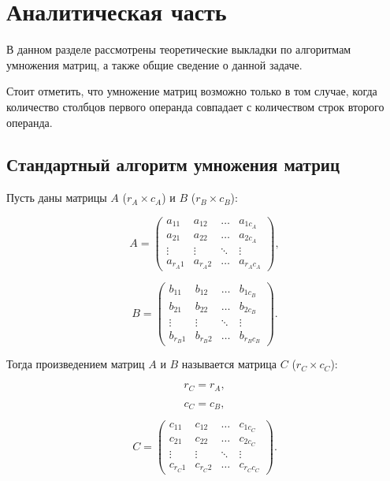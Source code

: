 \chapter{Аналитическая часть}

В данном разделе рассмотрены теоретические выкладки по алгоритмам умножения матриц, а также общие сведение о данной задаче.

Стоит отметить, что умножение матриц возможно только в том случае, когда количество столбцов первого операнда совпадает с количеством строк второго операнда.

\section{Стандартный алгоритм умножения матриц}

Пусть даны матрицы $A$ ($r_A \times c_A$) и $B$ ($r_B \times c_B$):

\begin{equation} \label{eqn:A}
	A = \begin{pmatrix}
		a_{11} & a_{12} & \ldots & a_{1c_A}\\
		a_{21} & a_{22} & \ldots & a_{2c_A}\\
		\vdots & \vdots & \ddots & \vdots\\
		a_{r_A1} & a_{r_A2} & \ldots & a_{r_Ac_A}
	\end{pmatrix},
\end{equation}

\begin{equation} \label{eqn:B}
	B = \begin{pmatrix}
		b_{11} & b_{12} & \ldots & b_{1c_B}\\
		b_{21} & b_{22} & \ldots & b_{2c_B}\\
		\vdots & \vdots & \ddots & \vdots\\
		b_{r_B1} & b_{r_B2} & \ldots & b_{r_Bc_B}
	\end{pmatrix}.
\end{equation}

Тогда произведением матриц $A$ и $B$ называется матрица $C$ ($r_C \times c_C$):

\begin{equation} \label{eqn:r-C}
	r_C = r_A,
\end{equation}

\begin{equation} \label{eqn:c-C}
	c_C = c_B,
\end{equation}

\begin{equation} \label{eqn:C}
	C = \begin{pmatrix}
		c_{11} & c_{12} & \ldots & c_{1c_C}\\
		c_{21} & c_{22} & \ldots & c_{2c_C}\\
		\vdots & \vdots & \ddots & \vdots\\
		c_{r_C1} & c_{r_C2} & \ldots & c_{r_Cc_C}
	\end{pmatrix}.
\end{equation}

